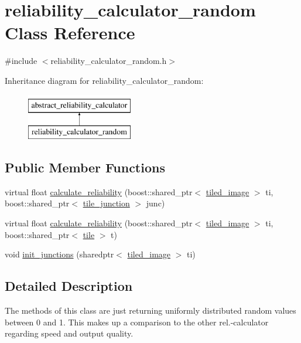 \hypertarget{classreliability__calculator__random}{\section{reliability\-\_\-calculator\-\_\-random Class Reference}
\label{classreliability__calculator__random}
}


{\ttfamily \#include $<$reliability\-\_\-calculator\-\_\-random.\-h$>$}

Inheritance diagram for reliability\-\_\-calculator\-\_\-random\-:\begin{figure}[H]
\begin{center}
\leavevmode
\includegraphics[height=2.000000cm]{classreliability__calculator__random}
\end{center}
\end{figure}
\subsection*{Public Member Functions}
\begin{DoxyCompactItemize}
\item 
virtual float \hyperlink{classreliability__calculator__random_a73524f3dd704cb666c794b765e4216fc}{calculate\-\_\-reliability} (boost\-::shared\-\_\-ptr$<$ \hyperlink{classtiled__image}{tiled\-\_\-image} $>$ ti, boost\-::shared\-\_\-ptr$<$ \hyperlink{classtile__junction}{tile\-\_\-junction} $>$ junc)
\item 
virtual float \hyperlink{classreliability__calculator__random_a7e49000129535b04968a5fb7a87fd5e4}{calculate\-\_\-reliability} (boost\-::shared\-\_\-ptr$<$ \hyperlink{classtiled__image}{tiled\-\_\-image} $>$ ti, boost\-::shared\-\_\-ptr$<$ \hyperlink{classtile}{tile} $>$ t)
\item 
void \hyperlink{classreliability__calculator__random_a3b5b45c3e398b70398ba139eb6046dc5}{init\-\_\-junctions} (sharedptr$<$ \hyperlink{classtiled__image}{tiled\-\_\-image} $>$ ti)
\end{DoxyCompactItemize}


\subsection{Detailed Description}
The methods of this class are just returning uniformly distributed random values between 0 and 1. This makes up a comparison to the other rel.-\/calculator regarding speed and output quality. 

